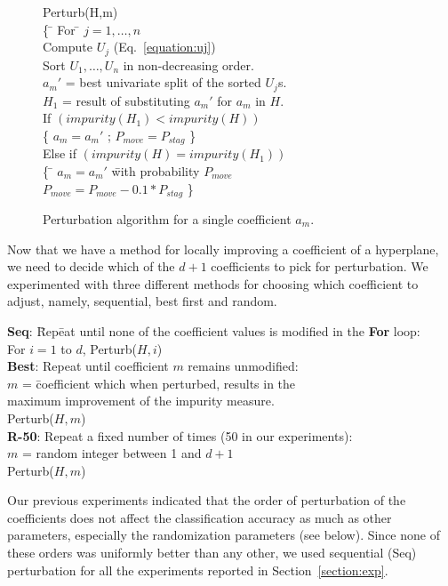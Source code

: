 \begin{figure}
{\small
{\bf
\begin{tabbing}
\noindent Perturb(H,m) \\
\{  \= \kill
    \> For \= $j = 1,\ldots,n$\\
    \>     \> Compute $U_j$ (Eq.~\ref{equation:uj})\\ 
    \> Sort $U_1,\ldots,U_n$ in non-decreasing order.\\
    \> $a_m'$ = best univariate split of the sorted $U_j$s.\\
    \> $H_1$ = result of substituting $a_m'$ for $a_m$ in $H$.\\
    \> If \((impurity(H_1) < impurity(H)) \)\\
    \>    \> \{ $a_m = a_m'$ ; $P_{move} = P_{stag}$  \} \\
    \> Else if \((impurity(H) = impurity(H_1)) \) \\
    \>  \> \{  \= $a_m = a_m'$ \=with probability $P_{move}$\\
    \>  \>     \> $P_{move} = P_{move} - 0.1 * P_{stag}$ \} \\
\end{tabbing}
}
}
\vspace*{-.3in}
\caption{Perturbation algorithm for a single coefficient $a_m$.}
\label{figure:perturb}
\vspace*{-.1in}
\end{figure}

Now that we have a method for locally improving a coefficient of a
hyperplane, we need to decide which of the $d+1$ coefficients to pick
for perturbation.  We experimented with three different methods for
choosing which coefficient to adjust, namely, sequential, best first
and random.
\begin{tabbing}
{\bf Seq}: \hspace*{0.1in} \= Rep\=eat until none of the coefficient values is 
              modified in the {\bf For} loop:\\
             \>        \>For $i=1$ to $d$, Perturb($H,i$)\\
{\bf Best}:  \> Repeat until coefficient $m$ remains unmodified: \\
           \>        \>$m$ = \=coefficient which when perturbed, results in the \\
           \>        \>    \>maximum improvement of the impurity measure.\\
           \>        \>Perturb($H,m$)\\
{\bf R-50}:  \> Repeat a fixed number of times (50 in our experiments): \\
           \>        \>$m$ = random integer between 1 and $d+1$\\
           \>        \>Perturb($H,m$)\\
\end{tabbing}     
Our previous experiments \cite{murthy/etal/93} indicated that the
order of perturbation of the coefficients does not affect the
classification accuracy as much as other parameters, especially the
randomization parameters (see below).  Since none of these orders was
uniformly better than any other, we used sequential (Seq) perturbation
for all the experiments reported in Section~\ref{section:exp}.
 


